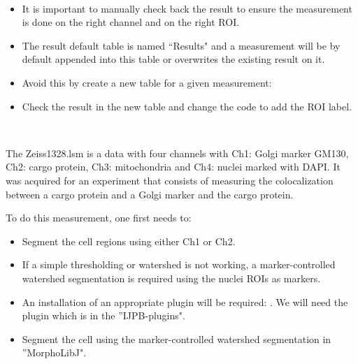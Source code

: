 \begin{frame}[fragile]
	\begin{example}~\par
		\begin{itemize}
			\item It is important to manually check back the result to ensure the measurement is done on the right channel and on the right ROI.
			\item The result default table is named ``Results" and a measurement will be by default appended into this table or overwrites the existing result on it.
			\item Avoid this by create a new table for a given measurement:\par
			
			\item Check the result in the new table and change the code to add the ROI label.
		\end{itemize}
	\end{example}
\end{frame}

\begin{frame}[fragile]
	\begin{example}~\par
		The Zeiss1328.lsm is a data with four channels with Ch1: Golgi marker GM130, Ch2: cargo protein, Ch3: mitochondria and Ch4: nuclei marked with DAPI. It was acquired for an experiment that consists of measuring the colocalization between a cargo protein and a Golgi marker and the cargo protein. \vspace{0.15cm}
		
		To do this measurement, one first needs to:
		\begin{itemize}
			\item Segment the cell regions using either Ch1 or Ch2.
			\item If a simple thresholding or watershed is not working, a marker-controlled watershed segmentation is required using the nuclei ROIs as markers.
			\item An installation of an appropriate plugin will be required: . We will need the plugin  which is in the ''IJPB-plugins".
			\item Segment the cell using the marker-controlled watershed segmentation in ''MorphoLibJ".
		\end{itemize}
	\end{example}
\end{frame}

